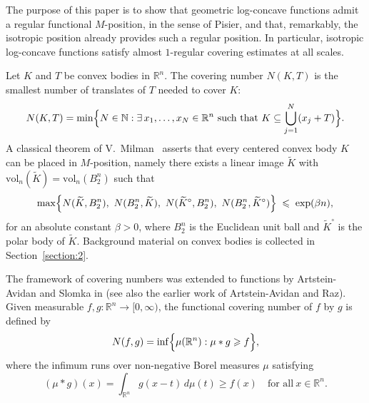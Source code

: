 \documentclass[11pt,leqno]{article}
\theoremstyle{definition}
\theoremstyle{remark}
\numberwithin{equation}{section}
\newcommand{\vol}{\mathrm{vol}}
\newcommand{\ls}{\leqslant}
\newcommand{\gr}{\geqslant}
\begin{document}
The purpose of this paper is to show that geometric log-concave functions
admit a regular functional $M$-position, in the sense of Pisier, and that, remarkably, 
the isotropic position already provides such a regular position. In particular, isotropic log-concave 
functions satisfy almost $1$-regular covering estimates at all scales.

\smallskip

Let $K$ and $T$ be convex bodies in $\mathbb{R}^{n}$. The covering number $N(K,T)$ is the smallest number of translates of $T$
needed to cover $K$:
$$N(K,T)= \min\Bigl\{ N\in\mathbb{N} : \exists\, x_1, \ldots, x_N \in \mathbb{R}^n
\ \text{such that} \ K \subseteq \bigcup_{j=1}^{N} (x_{j}+T)\Bigr\}.$$
A classical theorem of V.~Milman~\cite{VMilman-1986} asserts that every
centered convex body $K$ can be placed in $M$-position, namely there
exists a linear image $\widetilde K$ with $\vol_{n}(\widetilde K)=\vol_{n}(B_{2}^{n})$
such that
\begin{equation}  \label{betaMposition}
\max\Bigl\{N(\widetilde{K}, B_2^n),\ N(B_2^n, \widetilde{K}),\
N(\widetilde{K}^{\circ}, B_2^n),\ N(B_2^n, \widetilde{K}^{\circ})\Bigr\}\;\ls\; \exp(\beta n),
\end{equation}
for an absolute constant $\beta>0$, where $B_2^n$ is the Euclidean unit ball and 
$\widetilde{K}^{\circ}$ is the polar body of $\widetilde{K}$. Background material on convex bodies
is collected in Section~\ref{section:2}.

\smallskip

The framework of covering numbers was extended to functions by Artstein-Avidan and Slomka in
\cite{Artstein-Slomka-2015} (see also the earlier work \cite{Artstein-Raz-2011} of Artstein-Avidan
and Raz). Given measurable $f,g:\mathbb{R}^{n}\to[0,\infty)$, the functional covering number
of $f$ by $g$ is defined by
$$N(f,g)= \inf\Bigl\{ \mu(\mathbb{R}^{n}) : \mu\ast g \gr f \Bigr\},$$
where the infimum runs over non-negative Borel measures $\mu$ satisfying
$$(\mu\ast g)(x) = \int_{\mathbb{R}^n} g(x-t)\, d\mu(t) \gr f(x)\quad \text{for all} \ x\in\mathbb{R}^n.$$
\end{document}
